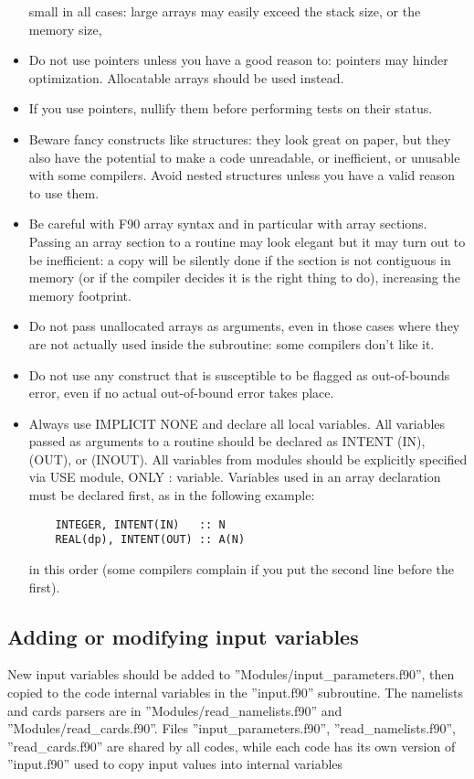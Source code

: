 \documentclass[12pt,a4paper]{article}
\begin{document}
\begin{itemize}
small in all cases: large arrays may easily exceed the stack size,
or the memory size,
\item Do not use pointers unless you have a good reason to:
pointers may hinder optimization. Allocatable arrays should be used instead.
\item If you use pointers, nullify them before performing tests on their
status.
\item Beware fancy constructs like structures: they look great on paper,
but they also have the potential to make a code unreadable, or inefficient,
or unusable with some compilers. Avoid nested structures unless you have a
valid reason to use them.
\item Be careful with F90 array syntax and in particular with
array sections. Passing an array section to a routine may look elegant
but it may turn out to be inefficient: a copy will be silently done
if the section is not contiguous in memory (or if the compiler
decides it is the right thing to do), increasing the memory footprint.
\item Do not pass unallocated arrays as arguments, even in those cases where
they are not actually used inside the subroutine: some compilers don't
like it.
\item Do not use any construct that is susceptible to be flagged as
out-of-bounds error, even if no actual out-of-bound error takes place.
\item Always use IMPLICIT NONE and declare all local variables.
All variables passed as arguments to a routine should be declared as
INTENT (IN), (OUT), or (INOUT). All variables from modules should be
explicitly specified via USE module, ONLY : variable. Variables used
in an array declaration must be declared first, as in the following
example:
\begin{verbatim}
    INTEGER, INTENT(IN)   :: N
    REAL(dp), INTENT(OUT) :: A(N)
\end{verbatim}
in this order (some compilers complain if you put the second line
before the first).
\end{itemize}

\subsection{Adding or modifying input variables}

New input variables should be added to
''Modules/input\_parameters.f90'',
then copied to the code internal variables in the ''input.f90''
subroutine. The namelists and cards parsers are in
''Modules/read\_namelists.f90'' and ''Modules/read\_cards.f90''.
Files ''input\_parameters.f90'', ''read\_namelists.f90'',
''read\_cards.f90'' are shared by all codes, while each code
has its own version of ''input.f90''  used to copy input values
into internal variables
\end{document}
